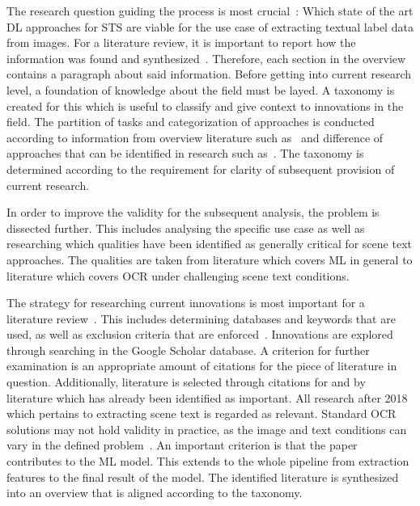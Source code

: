 The research question guiding the process is most crucial~\citep{snyder_literature_2019}:
Which state of the art \ac{DL} approaches for \ac{STS} are viable for the use case of extracting
textual label data from images.
For a literature review, it is important to report how the information was found and
synthesized~\citep{torraco_writing_2005}.
Therefore, each section in the overview contains a paragraph about said information.
Before getting into current research level, a foundation of knowledge about the field must be layed.
A taxonomy is created for this which is useful to classify and give context to innovations in the
field.
The partition of tasks and categorization of approaches is conducted according to information from
overview literature such as~\cite{long_scene_2021,chen_text_2021,cong_comparative_2019} and
difference of approaches that can be identified in research such
as~\cite{qiao_text_2021,sheng_centripetaltext_2021,liu_accurate_2020,deng_pixellink_2018}.
The taxonomy is determined according to the requirement for clarity of subsequent provision of
current research.

In order to improve the validity for the subsequent analysis, the problem is dissected further.
This includes analysing the specific use case as well as researching which qualities have been
identified as generally critical for scene text approaches.
The qualities are taken from literature which covers \ac{ML} in general to literature
which covers \ac{OCR} under challenging scene text conditions.

The strategy for researching current innovations is most important for a literature
review~\citep{snyder_literature_2019}.
This includes determining databases and keywords that are used, as well as exclusion criteria
that are enforced~\citep{torraco_writing_2005}.
Innovations are explored through searching in the Google Scholar database.
A criterion for further examination is an appropriate amount of citations for the piece of literature
in question.
Additionally, literature is selected through citations for and by literature which has already been
identified as important.
All research after 2018 which pertains to extracting scene text is regarded as relevant.
Standard \ac{OCR} solutions may not hold validity in practice, as the image and text conditions can
vary in the defined problem~\citep{chen_text_2021}.
An important criterion is that the paper contributes to the \ac{ML} model.
This extends to the whole pipeline from extraction features to the final result of the model.
The identified literature is synthesized into an overview that is aligned according to the taxonomy.

